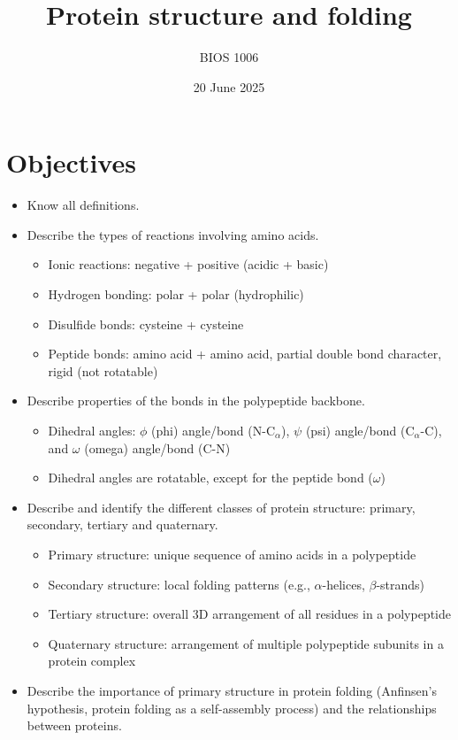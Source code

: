 \documentclass[letterpaper, 12pt]{article}
\title{Protein structure and folding}
\author{BIOS 1006}
\date{20 June 2025}
\begin{document}
\maketitle

\section*{Objectives}

\begin{itemize}
\item Know all definitions.
\item Describe the types of reactions involving amino acids.
\begin{itemize}
\item Ionic reactions: negative + positive (acidic + basic)
\item Hydrogen bonding: polar + polar (hydrophilic)
\item Disulfide bonds: cysteine + cysteine
\item Peptide bonds: amino acid + amino acid, partial double bond character, rigid (not rotatable)
\end{itemize}
\item Describe properties of the bonds in the polypeptide backbone.
\begin{itemize}
\item Dihedral angles: $\phi$ (phi) angle/bond (N-C$_\alpha$), $\psi$ (psi) angle/bond (C$_\alpha$-C), and $\omega$ (omega) angle/bond (C-N)
\item Dihedral angles are rotatable, except for the peptide bond ($\omega$)
\end{itemize}
\item Describe and identify the different classes of protein structure: primary, secondary, tertiary and quaternary.
\begin{itemize}
\item Primary structure: unique sequence of amino acids in a polypeptide
\item Secondary structure: local folding patterns (e.g., $\alpha$-helices, $\beta$-strands)
\item Tertiary structure: overall 3D arrangement of all residues in a polypeptide
\item Quaternary structure: arrangement of multiple polypeptide subunits in a protein complex
\end{itemize}
\item Describe the importance of primary structure in protein folding (Anfinsen's hypothesis, protein folding as a self-assembly process) and the relationships between proteins.

\end{itemize}
\end{document}
